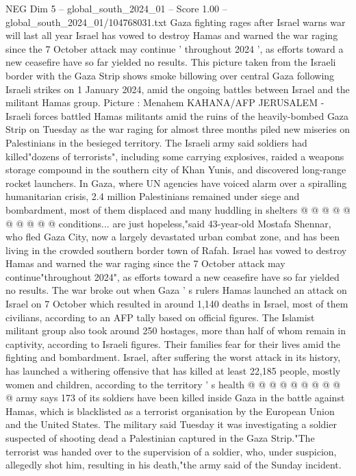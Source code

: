 \begin{textsample}{NEG Dim 5 – global\_south\_2024\_01 – Score 1.00 – global\_south\_2024\_01/104768031.txt}  \label{ex:f5_neg_437}
Gaza fighting rages after Israel warns war will last all year Israel has vowed to destroy Hamas and warned the war raging since the 7 October attack may continue ' throughout 2024 ', as efforts toward a new ceasefire have so far yielded no results.
This picture taken from the Israeli border with the Gaza Strip shows smoke billowing over central Gaza following Israeli strikes on 1 January 2024, amid the ongoing battles between Israel and the militant Hamas group.
Picture : Menahem KAHANA/AFP JERUSALEM - Israeli forces battled Hamas militants amid the ruins of the heavily-bombed Gaza Strip on Tuesday as the war raging for almost three months piled new miseries on Palestinians in the besieged territory.
The Israeli army said soldiers had killed"dozens of terrorists", including some carrying explosives, raided a weapons storage compound in the southern city of Khan Yunis, and discovered long-range rocket launchers.
In Gaza, where UN agencies have voiced alarm over a spiralling humanitarian crisis, 2.4 million Palestinians remained under siege and bombardment, most of them displaced and many huddling in shelters @ @ @ @ @ @ @ @ @ @ conditions... are just hopeless,"said 43-year-old Mostafa Shennar, who fled Gaza City, now a largely devastated urban combat zone, and has been living in the crowded southern border town of Rafah.
Israel has vowed to destroy Hamas and warned the war raging since the 7 October attack may continue"throughout 2024", as efforts toward a new ceasefire have so far yielded no results.
The war broke out when Gaza ' s rulers Hamas launched an attack on Israel on 7 October which resulted in around 1,140 deaths in Israel, most of them civilians, according to an AFP tally based on official figures.
The Islamist militant group also took around 250 hostages, more than half of whom remain in captivity, according to Israeli figures.
Their families fear for their lives amid the fighting and bombardment.
Israel, after suffering the worst attack in its history, has launched a withering offensive that has killed at least 22,185 people, mostly women and children, according to the territory ' s health @ @ @ @ @ @ @ @ @ @ army says 173 of its soldiers have been killed inside Gaza in the battle against Hamas, which is blacklisted as a terrorist organisation by the European Union and the United States.
The military said Tuesday it was investigating a soldier suspected of shooting dead a Palestinian captured in the Gaza Strip."The terrorist was handed over to the supervision of a soldier, who, under suspicion, allegedly shot him, resulting in his death,"the army said of the Sunday incident.

\end{textsample}
